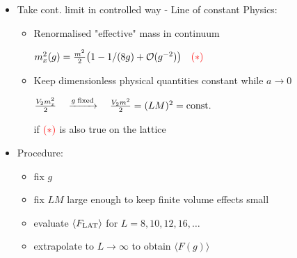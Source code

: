 \documentclass{beamer}
\begin{document}

\begin{frame}
\begin{itemize}
\item Take cont. limit in controlled way - {\color{blue!90} Line of constant Physics:}
\begin{itemize}
\item Renormalised "effective" mass in continuum\\
\begin{center}
$m_{x}^{2}(g) = \frac{m^{2}}{2} \big(1- 1/(8g) + \mathcal{O}(g^{-2})\big)\quad {\color{red}(\ast)}$
\end{center}
\item Keep dimensionless physical quantities constant while $a\to 0$\\
\begin{center}
$\frac{V_{2}m_{x}^{2}}{2} \quad \xrightarrow{g \;{\rm fixed}}{} \quad \frac{V_{2}m^{2}}{2} = (LM)^{2} = {\rm const.}$
\end{center}
if ${\small \color{red}(\ast)}$ is also true on the lattice
\end{itemize}\vspace{2mm}
\item Procedure:
\begin{itemize}
\item fix $g$
\item fix $LM$ large enough to keep finite volume effects small
\item evaluate $\langle F_{\rm LAT} \rangle$ for $L=8,10,12,16,\ldots$
\item extrapolate to $L\to \infty$ to obtain $\langle F(g) \rangle$
\end{itemize}
\end{itemize}

\begin{center}


\end{center}
\end{frame}
\end{document}
